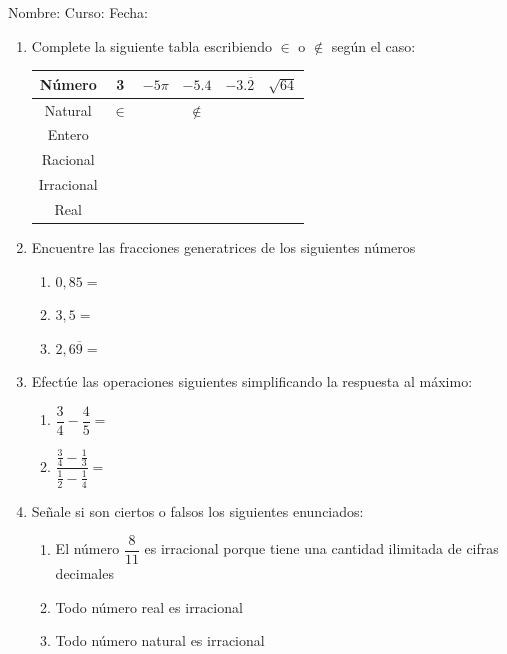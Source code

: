 \documentclass[fleqn,twocolum]{article}
\newcommand{\LineaNombre}{%
\par
\vspace{\baselineskip}
Nombre:\hrulefill \; Curso: \underline{\hspace*{36pt}} \; Fecha: \underline{\hspace*{2.5cm}} \relax
\par}
\begin{document}
\LineaNombre
\begin{enumerate}
   \item Complete la siguiente tabla escribiendo $\in$ o $\not\in$ según el caso:
\begin{center}
   \begin{tabular}{|c|c|c|c|c|c|}
\hline 
Número & 3 & $-5\pi$ & $-5.4$ & $-3.\overline{2}$ & $\sqrt{64}$ \\ 
\hline 
Natural & $\in$ &  & $\not\in$ &  &  \\ 
\hline 
Entero &  &  &  &  &  \\ 
\hline 
Racional &  &  &  &  &  \\ 
\hline 
Irracional &  &  &  &  &  \\ 
\hline 
Real &  &  &  &  &  \\ 
\hline 
\end{tabular} 
\end{center}
 \item Encuentre las fracciones generatrices de los siguientes números
\begin{enumerate}
\item $0,85=$\noanswer
\item $3,5=$\noanswer
\item $2,6\overline{9}=$\noanswer
\end{enumerate}
 \item Efectúe las operaciones siguientes simplificando la respuesta al máximo:
 \begin{enumerate}
 \item $\dfrac{3}{4}-\dfrac{4}{5}=$\noanswer
 \item $\dfrac{\frac{3}{4}-\frac{1}{3}}{\frac{1}{2}-\frac{1}{4}}=$\noanswer 
 \end{enumerate}
 \newpage
\item Señale si son ciertos o falsos los siguientes enunciados:
\begin{enumerate}
\item El número $\dfrac{8}{11}$ es irracional porque tiene una cantidad ilimitada de cifras decimales \underline{\hspace*{20pt}}
\item Todo número real es irracional \underline{\hspace*{20pt}}
\item Todo número natural es irracional \underline{\hspace*{20pt}}

\end{enumerate}
\end{enumerate}
\end{document}
